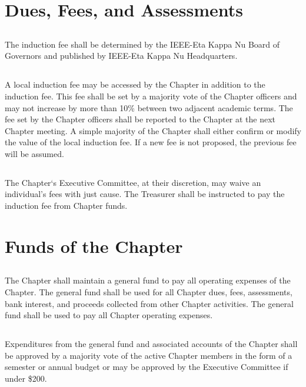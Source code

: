 \documentclass[10pt, oneside]{article}
\begin{document}
\section{Dues, Fees, and Assessments}
\subsection{}
The induction fee shall be determined by the IEEE-Eta Kappa Nu Board of Governors and published by IEEE-Eta Kappa Nu Headquarters.

\subsection{}
A local induction fee may be accessed by the Chapter in addition to the induction fee. This fee shall be set by a majority vote of the Chapter officers and may not increase by more than 10\% between two adjacent academic terms. The fee set by the Chapter officers shall be reported to the Chapter at the next Chapter meeting. A simple majority of the Chapter shall either confirm or modify the value of the local induction fee. If a new fee is not proposed, the previous fee will be assumed.

\subsection{}
The Chapter‘s Executive Committee, at their discretion, may waive an individual’s fees with just cause. The Treasurer shall be instructed to pay the induction fee from Chapter funds.

\section{Funds of the Chapter}
\subsection{}
The Chapter shall maintain a general fund to pay all operating expenses of the Chapter. The general fund shall be used for all Chapter dues, fees, assessments, bank interest, and proceeds collected from other Chapter activities. The general fund shall be used to pay all Chapter operating expenses.

\subsection{}
Expenditures from the general fund and associated accounts of the Chapter shall be approved by a majority vote of the active Chapter members in the form of a semester or annual budget or may be approved by the Executive Committee if under \$200.
\end{document}
